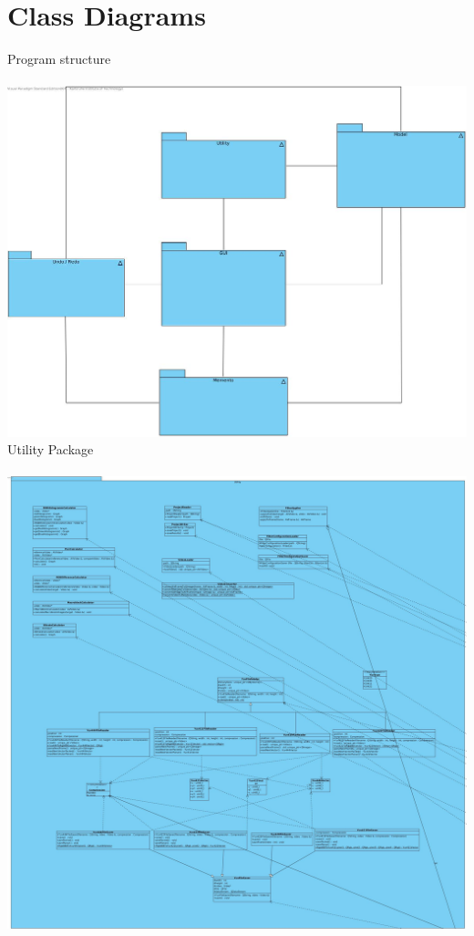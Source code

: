 \documentclass[twoside]{book}
\newcommand{\+}{\discretionary{\mbox{\scriptsize$\hookleftarrow$}}{}{}}
\begin{document}
\section{Class Diagrams}
Program structure\\\\
{\centering\includegraphics[width=1\textwidth]{Grobuebersicht.jpg}}\\
\newpage
Utility Package\\\\
{\centering\includegraphics[width=1\textwidth]{Utility.jpg}}\\
\end{document}
